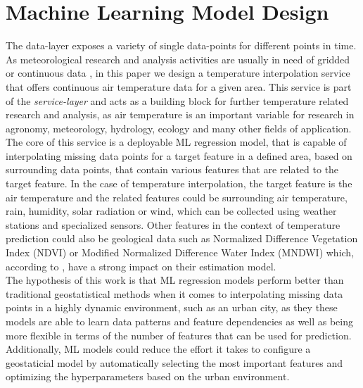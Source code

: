 \chapter{Machine Learning Model Design}
\label{chap:Machine Learning Model Design}

The data-layer exposes a variety of single data-points for different points in time. As meteorological research and analysis activities are usually in need of gridded or continuous data \cite{sekulic2020spatio}, in this paper we design a temperature interpolation service that offers continuous air temperature data for a given area. This service is part of the \textit{service-layer} and acts as a building block for further temperature related research and analysis, as air temperature is an important variable for research in agronomy, meteorology, hydrology, ecology and many other fields of application.\\
The core of this service is a deployable ML regression model, that is capable of interpolating missing data points for a target feature in a defined area, based on surrounding data points, that contain various features that are related to the target feature. In the case of temperature interpolation, the target feature is the air temperature and the related features could be surrounding air temperature, rain, humidity, solar radiation or wind, which can be collected using weather stations and specialized sensors. Other features in the context of temperature prediction could also be geological data such as  Normalized Difference Vegetation Index (NDVI) or Modified Normalized Difference Water Index (MNDWI) which, according to \cite{alonso2020new}, have a strong impact on their estimation model.\\
The hypothesis of this work is that ML regression models perform better than traditional geostatistical methods when it comes to interpolating missing data points in a highly dynamic environment, such as an urban city, as they these models are able to learn data patterns and feature dependencies as well as being more flexible in terms of the number of features that can be used for prediction. Additionally, ML models could reduce the effort it takes to configure a geostaticial model by automatically selecting the most important features and optimizing the hyperparameters based on the urban environment.

